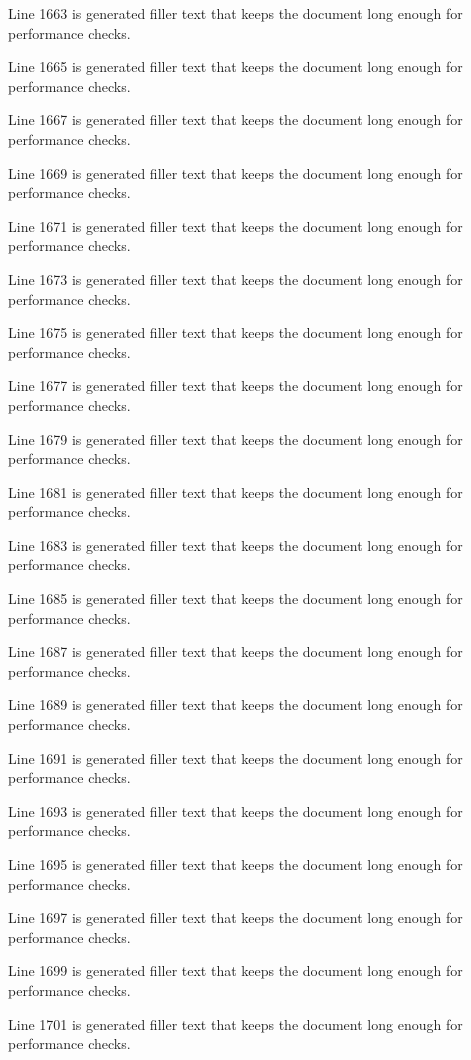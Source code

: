 Line 1663 is generated filler text that keeps the document long enough for performance checks.

Line 1665 is generated filler text that keeps the document long enough for performance checks.

Line 1667 is generated filler text that keeps the document long enough for performance checks.

Line 1669 is generated filler text that keeps the document long enough for performance checks.

Line 1671 is generated filler text that keeps the document long enough for performance checks.

Line 1673 is generated filler text that keeps the document long enough for performance checks.

Line 1675 is generated filler text that keeps the document long enough for performance checks.

Line 1677 is generated filler text that keeps the document long enough for performance checks.

Line 1679 is generated filler text that keeps the document long enough for performance checks.

Line 1681 is generated filler text that keeps the document long enough for performance checks.

Line 1683 is generated filler text that keeps the document long enough for performance checks.

Line 1685 is generated filler text that keeps the document long enough for performance checks.

Line 1687 is generated filler text that keeps the document long enough for performance checks.

Line 1689 is generated filler text that keeps the document long enough for performance checks.

Line 1691 is generated filler text that keeps the document long enough for performance checks.

Line 1693 is generated filler text that keeps the document long enough for performance checks.

Line 1695 is generated filler text that keeps the document long enough for performance checks.

Line 1697 is generated filler text that keeps the document long enough for performance checks.

Line 1699 is generated filler text that keeps the document long enough for performance checks.

Line 1701 is generated filler text that keeps the document long enough for performance checks.

